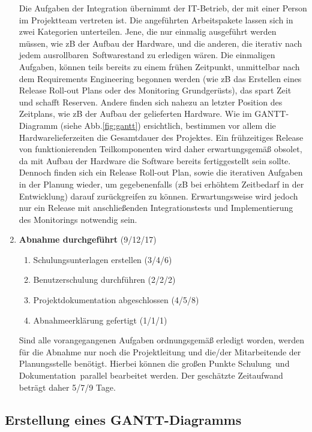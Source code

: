 \begin{enumerate}
	Die Aufgaben der Integration übernimmt der IT-Betrieb, der mit einer Person im Projektteam vertreten ist. Die angeführten Arbeitspakete lassen sich in zwei Kategorien unterteilen. Jene, die nur einmalig ausgeführt werden müssen, wie zB der Aufbau der Hardware, und die anderen, die iterativ nach jedem \glqq ausrollbaren\grqq\ Softwarestand zu erledigen wären. Die einmaligen Aufgaben, können teils bereits zu einem frühen Zeitpunkt, unmittelbar nach dem Requirements Engineering begonnen werden (wie zB das Erstellen eines Release Roll-out Plans oder des Monitoring Grundgerüsts), das spart Zeit und schafft Reserven. Andere finden sich nahezu an letzter Position des Zeitplans, wie zB der Aufbau der gelieferten Hardware. Wie im GANTT-Diagramm (siehe Abb.\ref{fig:gantt}) ersichtlich, bestimmen vor allem die Hardwarelieferzeiten die Gesamtdauer  des Projektes. Ein frühzeitiges Release von funktionierenden Teilkomponenten wird daher erwartungsgemäß obsolet, da mit Aufbau der Hardware die Software bereits fertiggestellt sein sollte.  Dennoch finden sich ein Release Roll-out Plan, sowie die iterativen Aufgaben in der Planung wieder, um gegebenenfalls (zB bei erhöhtem Zeitbedarf in der Entwicklung) darauf zurückgreifen zu können. Erwartungsweise wird jedoch nur ein Release mit anschließenden Integrationstests und Implementierung des Monitorings notwendig sein.
	
	\item \textbf{Abnahme durchgeführt} (9/12/17)
	\begin{enumerate}
		\item Schulungsunterlagen erstellen (3/4/6)
		\item Benutzerschulung durchführen (2/2/2)
		\item Projektdokumentation abgeschlossen (4/5/8)
		\item Abnahmeerklärung gefertigt (1/1/1)
	\end{enumerate}
	
	Sind alle vorangegangenen Aufgaben ordnungsgemäß erledigt worden, werden für die Abnahme nur noch die Projektleitung und die/der Mitarbeitende der Planungsstelle benötigt. Hierbei können die großen Punkte \glqq Schulung\grqq\ und \glqq Dokumentation\grqq\ parallel bearbeitet werden. Der geschätzte Zeitaufwand beträgt daher 5/7/9 Tage.
	
\end{enumerate}


\subsection{Erstellung eines GANTT-Diagramms}

